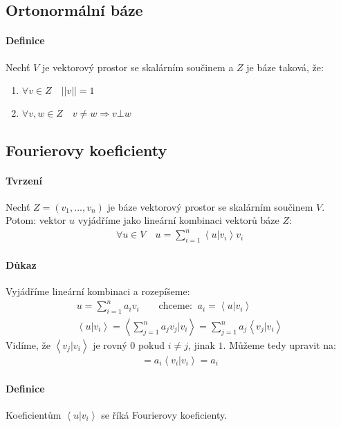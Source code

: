 \documentclass[a4paper,10pt]{article}
\begin{document}
\subsection{Ortonormální báze}
\setcounter{equation}{0}
\paragraph{Definice}
Nechť $V$ je vektorový prostor se skalárním součinem a $Z$ je báze taková, že:
\begin{enumerate}
	\item $\forall v \in Z \quad ||v|| = 1$
	\item $\forall v, w \in Z \quad v \neq w \Rightarrow v \bot w$
\end{enumerate}

\subsection{Fourierovy koeficienty}
\setcounter{equation}{0}
\paragraph{Tvrzení}
Nechť $Z=(v_1, ..., v_n)$ je báze vektorový prostor se skalárním součinem $V$.
Potom:
vektor $u$ vyjádříme jako lineární kombinaci vektorů báze $Z$:
\begin{align*}
	\forall u \in V \quad u = \sum_{i=1}^n \left<u|v_i\right>v_i
\end{align*}
\paragraph{Důkaz}
Vyjádříme lineární kombinaci a rozepíšeme:
\begin{align}
	u = \sum_{i=1}^n a_i v_i \qquad \text{chceme: } \  a_i = \left<u|v_i\right> \\
	\left<u|v_i\right> = \left< \sum_{j=1}^n a_jv_j|v_i \right> = \sum_{j=1}^n a_j \left<v_j|v_i\right>
\end{align}
Vidíme, že $\left<v_j|v_i\right>$ je rovný $0$ pokud $i \neq j$, jinak $1$. Můžeme tedy
upravit na:
\begin{align}
	= a_i \left<v_i|v_i\right> = a_i 
\end{align}
\paragraph{Definice}
Koeficientům $\left<u|v_i\right>$ se říká Fourierovy koeficienty.
\end{document}

